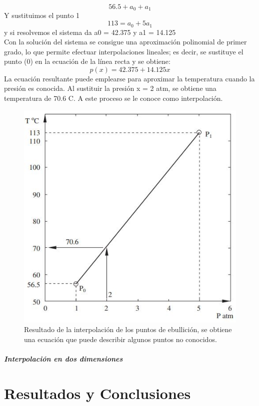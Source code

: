 \documentclass[12pt,letterpaper]{article}
\begin{document}
\begin{equation}
56.5+a_0+a_1
\end{equation}
Y sustituimos el punto 1
\begin{equation}
113=a_0+5a_1
\end{equation}
y si resolvemos el sistema da a0 = 42.375 y a1 = 14.125\\
Con la solución del sistema se consigue una aproximación polinomial de primer grado, lo que
permite efectuar interpolaciones lineales; es decir, se sustituye el punto (0) en la ecuación de la línea
recta y se obtiene:
\begin{equation}
p(x)=42.375+14.125x
\end{equation}
La ecuación resultante puede emplearse para aproximar la temperatura cuando la presión es conocida.
Al sustituir la presión x = 2 atm, se obtiene una temperatura de 70.6 C. A este proceso se le conoce como interpolación.
\begin{figure}[hbtp]
\centering
\includegraphics[scale=.5]{imagenes/interpolacion.JPG}
\caption{Resultado de la interpolación de los puntos de ebullición, se obtiene una ecuación que puede describir algunos puntos no conocidos.}
\end{figure}

\subparagraph{Interpolación en dos dimensiones}

\section{Resultados y Conclusiones}
\end{document}
